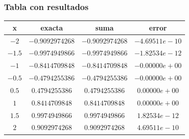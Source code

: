 \begin{frame}[fragile]
\frametitle{Tabla con resultados}
\begin{table}
\fontsize{12}{12}\selectfont
\begin{tabular}{c c c c}
x & exacta & suma & error \\ \hline
$-2$  & $-0.9092974268$ &  $-0.9092974268$ &  $-4.69511e-10$ \\ \hline
$-1.5$ & $-0.9974949866$ &  $-0.9974949866$ &  $-1.82534e-12$ \\ \hline
$-1$ & $-0.8414709848$ &  $-0.8414709848$ &  $-0.00000e+00$ \\ \hline
$-0.5$ & $-0.4794255386$ &  $-0.4794255386$ &  $-0.00000e+00$ \\ \hline
$0.5$ & $0.4794255386 $ &  $0.4794255386$ &  $0.00000e+00$ \\ \hline
$1$ & $0.8414709848$ &  $0.8414709848$ &  $0.00000e+00$ \\ \hline
$1.5$ & $0.9974949866$ &  $0.9974949866$ &  $1.82534e-12$ \\ \hline
$2$ & $0.9092974268$ &  $0.9092974268$ &  $4.69511e-10$ \\ \hline
\end{tabular}
\end{table}
\end{frame}
